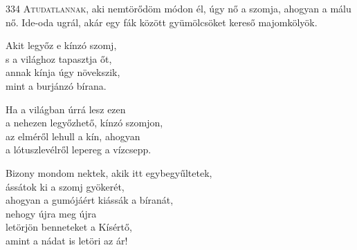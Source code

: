 
\vspace*{-2\baselineskip}

\begin{firstdhpverse}{334}
\lettrine[slope=0.5em]{A}{tudatlannak,} {\LettrineTextFont aki nemtörődöm módon él,}\newline
úgy nő a szomja, ahogyan a málu nő.\newline
Ide-oda ugrál, akár egy fák között\newline
gyümölcsöket kereső majomkölyök.
\end{firstdhpverse}

\begin{dhpverse}

 Akit legyőz e kínzó szomj,\\
s a világhoz tapasztja őt,\\
annak kínja úgy növekszik,\\
mint a burjánzó bírana.

 Ha a világban úrrá lesz ezen\\
a nehezen legyőzhető, kínzó szomjon,\\
az elméről lehull a kín, ahogyan\\
a lótuszlevélről lepereg a vízcsepp.

 Bizony mondom nektek, akik itt egybegyűltetek,\\
ássátok ki a szomj gyökerét,\\
ahogyan a gumójáért kiássák a bíranát,\\
nehogy újra meg újra\\
letörjön benneteket a Kísértő,\\
amint a nádat is letöri az ár!

\end{dhpverse}
\newpage
